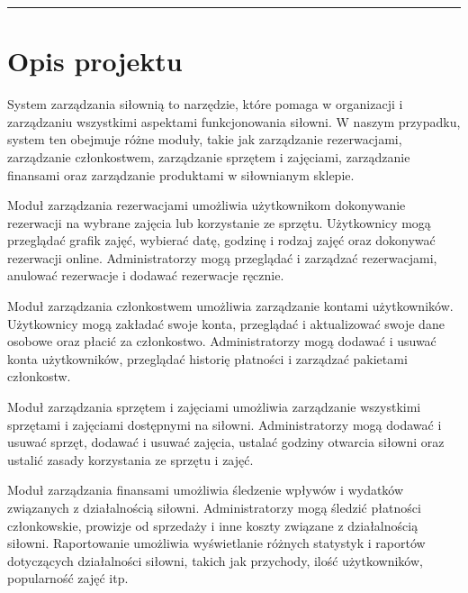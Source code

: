 \documentclass[
]{article}
\begin{document}
\begin{center}\rule{0.5\linewidth}{0.5pt}\end{center}

\hypertarget{h.f5nxkbb2jgn0}{%
\section{\texorpdfstring{{}}{}}\label{h.f5nxkbb2jgn0}}

\hypertarget{h.kiazpbhrern3}{%
\section{\texorpdfstring{{Opis
projektu}}{Opis projektu}}\label{h.kiazpbhrern3}}

{System zarządzania siłownią to narzędzie, które pomaga w organizacji i
zarządzaniu wszystkimi aspektami funkcjonowania siłowni. W naszym
przypadku, system ten obejmuje różne moduły, takie jak zarządzanie
rezerwacjami, zarządzanie członkostwem, zarządzanie sprzętem i
zajęciami, zarządzanie finansami oraz zarządzanie produktami w
siłownianym sklepie.}

{}

{Moduł zarządzania rezerwacjami umożliwia użytkownikom dokonywanie
rezerwacji na wybrane zajęcia lub korzystanie ze sprzętu. Użytkownicy
mogą przeglądać grafik zajęć, wybierać datę, godzinę i rodzaj zajęć oraz
dokonywać rezerwacji online. Administratorzy mogą przeglądać i zarządzać
rezerwacjami, anulować rezerwacje i dodawać rezerwacje ręcznie.}

{}

{Moduł zarządzania członkostwem umożliwia zarządzanie kontami
użytkowników. Użytkownicy mogą zakładać swoje konta, przeglądać i
aktualizować swoje dane osobowe oraz płacić za członkostwo.
Administratorzy mogą dodawać i usuwać konta użytkowników, przeglądać
historię płatności i zarządzać pakietami członkostw.}

{}

{Moduł zarządzania sprzętem i zajęciami umożliwia zarządzanie wszystkimi
sprzętami i zajęciami dostępnymi na siłowni. Administratorzy mogą
dodawać i usuwać sprzęt, dodawać i usuwać zajęcia, ustalać godziny
otwarcia siłowni oraz ustalić zasady korzystania ze sprzętu i zajęć.}

{}

{Moduł zarządzania finansami umożliwia śledzenie wpływów i wydatków
związanych z działalnością siłowni. Administratorzy mogą śledzić
płatności członkowskie, prowizje od sprzedaży i inne koszty związane z
działalnością siłowni. Raportowanie umożliwia wyświetlanie różnych
statystyk i raportów dotyczących działalności siłowni, takich jak
przychody, ilość użytkowników, popularność zajęć itp.}
\end{document}
